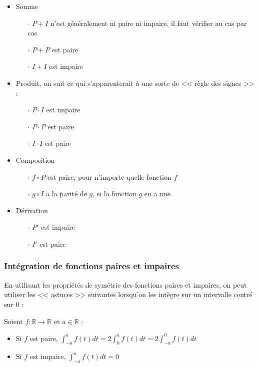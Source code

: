 \documentclass[12pt, a4paper]{article}
\begin{document}
\begin{itemize}
	\item Somme
		\begin{itemize}
			\item[$\cdot$] $P + I$ n'est généralement ni paire ni impaire, il faut vérifier au cas par cas
			\item[$\cdot$] $P + P$ est paire
			\item[$\cdot$] $I + I$ est impaire
		\end{itemize}
	\item Produit, on suit ce qui s'apparenterait à une sorte de << règle des signes >> :
		\begin{itemize}
			\item[$\cdot$] $P \cdot I$ est impaire
			\item[$\cdot$] $P \cdot P$ est paire
			\item[$\cdot$] $I \cdot I$ est paire
		\end{itemize}
	\item Composition
		\begin{itemize}
			\item[$\cdot$] $f \circ P$ est paire, pour n'importe quelle fonction $f$
			\item[$\cdot$] $g \circ I$ a la parité de $g$, si la fonction $g$ en a une.
		\end{itemize}
	\item Dérivation
		\begin{itemize}
			\item[$\cdot$] $P'$ est impaire
			\item[$\cdot$] $I'$ est paire
		\end{itemize}
\end{itemize}

\subsubsection{Intégration de fonctions paires et impaires}

En utilisant les propriétés de symétrie des fonctions paires et impaires, on peut utiliser les << astuces >> suivantes lorsqu'on les intègre sur un intervalle centré sur 0 :

\begin{tcolorbox}
	Soient $f:\mathbb{R} \to \mathbb{R}$ et $a \in \mathbb{R}$ :
	\begin{itemize}
		\item Si $f$ est paire, $\displaystyle \int_{-a}^{a} f(t)dt = 2 \int_0^{a} f(t)dt = 2 \int_{-a}^{0} f(t)dt$
		\item Si $f$ est impaire, $\displaystyle \int_{-a}^{a} f(t)dt = 0$
	\end{itemize}
\end{tcolorbox}
\end{document}
